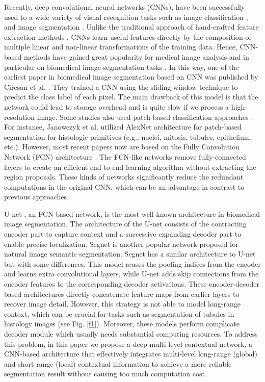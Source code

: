 \documentclass[10pt,twocolumn]{article}
\begin{document}
Recently, deep convolutional neural networks (CNNs), have been successfully used to a wide variety of visual recognition tasks such as image classification \cite{r1,r2}, and image segmentation \cite{r3,r8}. Unlike the traditional approach of hand-crafted feature extraction methods \cite{r21,r22,r23}, CNNs learn useful features directly by the composition of multiple linear and non-linear transformations of the training data. Hence, CNN-based methods have gained great popularity for medical image analysis and in particular on biomedical image segmentation tasks \cite{r14,r24,r25}.
In this way, one of the earliest paper in biomedical image segmentation based on CNN was published by Ciresan et al. \cite{r4}. They trained a CNN using the sliding-window technique to predict the class label of each pixel. The main drawback of this model is that the network could lead to storage overhead and is quite slow if we process a high-resolution image. Some studies also used patch-based classification approaches \cite{r5,r6}. For instance, Janowczyk et al. \cite{r6} utilized AlexNet architecture \cite{r2} for patch-based segmentation for histologic primitives (e.g., nuclei, mitosis, tubules, epithelium, etc.). 
However, most recent papers now are based on the Fully Convolution Network (FCN) architecture \cite{r3}. The FCN-like networks remove fully-connected layers to create an efficient end-to-end learning algorithm without extracting the region proposals. These kinds of networks significantly reduce the redundant computations in the original CNN, which can be an advantage in contrast to previous approaches.

U-net \cite{r7}, an FCN based network, is the most well-known architecture in biomedical image segmentation.
The architecture of the U-net consists of the contracting encoder part to capture context and a successive expanding decoder part to enable precise localization.
Segnet \cite{r8} is another popular network proposed for natural image semantic segmentation. Segnet has a similar architecture to U-net but with some differences.
This model reuses the pooling indices from the encoder and learns extra convolutional layers, while U-net adds skip connections from the encoder features to the corresponding decoder activations.
These encoder-decoder based architectures directly concatenate feature maps from earlier layers to recover image detail. However, this strategy is not able to model long-range context, which can be crucial for tasks such as segmentation of tubules in histology images (see Fig. \ref{f1}). Moreover, these models perform complicate decoder module which usually needs substantial computing resources. To address this problem, in this paper we propose a deep multi-level contextual network, a CNN-based architecture that effectively integrates multi-level long-range (global) and short-range (local) contextual information to achieve a more reliable segmentation result without causing too much computation cost. 
\end{document}
